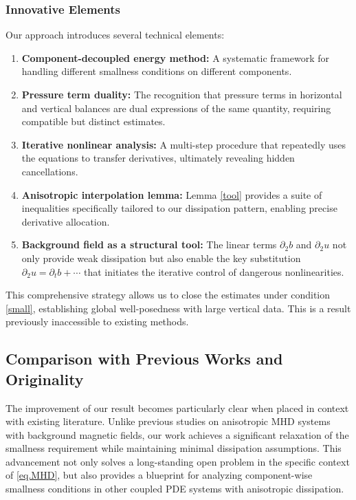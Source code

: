 \documentclass[11pt]{amsart}
\theoremstyle{definition}
\numberwithin{equation}{section}
\begin{document}
\subsubsection{Innovative Elements}

Our approach introduces several technical elements:

\begin{enumerate}
	\item \textbf{Component-decoupled energy method:} A systematic framework for handling different smallness conditions on different components.
	
	\item \textbf{Pressure term duality:} The recognition that pressure terms in horizontal and vertical balances are dual expressions of the same quantity, requiring compatible but distinct estimates.
	
	\item \textbf{Iterative nonlinear analysis:} A multi-step procedure that repeatedly uses the equations to transfer derivatives, ultimately revealing hidden cancellations.
	
	\item \textbf{Anisotropic interpolation lemma:} Lemma \ref{tool} provides a suite of inequalities specifically tailored to our dissipation pattern, enabling precise derivative allocation.
	
	\item \textbf{Background field as a structural tool:} The linear terms $\partial_2 b$ and $\partial_2 u$ not only provide weak dissipation but also enable the key substitution $\partial_2 u = \partial_t b + \cdots$ that initiates the iterative control of dangerous nonlinearities.
\end{enumerate}

This comprehensive strategy allows us to close the estimates under condition \eqref{small}, establishing global well-posedness with large vertical data. This is a result previously inaccessible to existing methods.



\subsection{Comparison with Previous Works and Originality}

The improvement of our result becomes particularly clear when placed in context with existing literature. Unlike previous studies on anisotropic MHD systems with background magnetic fields, our work achieves a significant relaxation of the smallness requirement while maintaining minimal dissipation assumptions. This advancement not only solves a long-standing open problem in the specific context of \eqref{eq.MHD}, but also provides a blueprint for analyzing component-wise smallness conditions in other coupled PDE systems with anisotropic dissipation.
\end{document}
